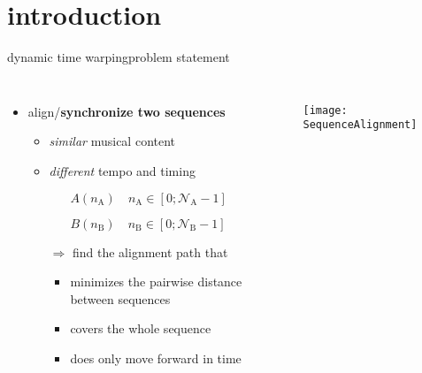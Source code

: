     \section[intro]{introduction}
        \begin{frame}{dynamic time warping}{problem statement}
            \begin{columns}
            \begin{itemize}
                \item   align/\textbf{synchronize two sequences}
                    \begin{itemize}
                        \item	\textit{similar} musical content
                        \item	\textit{different} tempo and timing
                            \begin{itemize}
                                \item[]	$A(n_\mathrm{A})\quad n_\mathrm{A} \in [0;\mathcal{N}_\mathrm{A}-1]$
                                \item[]	$B(n_\mathrm{B})\quad n_\mathrm{B} \in [0;\mathcal{N}_\mathrm{B}-1]$
                            \end{itemize}
                        \bigskip
                        \item[$\Rightarrow$] find the alignment path that 
                            \begin{itemize}
                                \item   minimizes the pairwise distance between sequences
                                \item   covers the whole sequence
                                \item   does only move forward in time
                            \end{itemize}
                    \end{itemize}
                \end{itemize}
                \begin{figure}
                    \texttt{[image: SequenceAlignment]}
                \end{figure}
            \end{columns}
        \end{frame}
